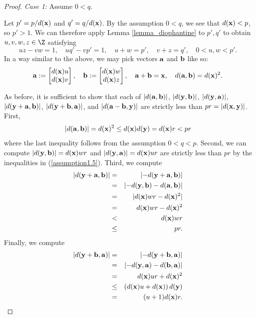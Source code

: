 \begin{proof}
	\noindent \emph{Case 1:} Assume $0 < q$. 
	
	Let $p' = p / d({\mathbf{x}})$ and $q' = q / d({\mathbf{x}})$. By the assumption $0 < q$, we see that $d({\mathbf{x}}) < p$, so $p' > 1$. We can therefore apply Lemma \ref{lemma_diophantine} to $p',q'$ to obtain $u,v,w,z \in \Z$ satisfying 
	\begin{equation}\label{assumption1.5}
	uz - vw = 1,\quad uq' - vp' = 1,\quad u + w = p',\quad v + z = q',\quad 0 < u,w < p'.
	\end{equation}
	In a way similar to the above, we may pick vectors ${\mathbf{a}}$ and ${\mathbf{b}}$ like so: %
	\begin{equation}\label{assumption2}
	\aab := \begin{bmatrix}  d(\xx)u\\ d(\xx)v\end{bmatrix},\quad 
	\bb := \begin{bmatrix} d(\xx)w\\ d(\xx)z\end{bmatrix},
	\quad \aab + \bb = \xx,\quad d(\aab, \bb) = d(\xx)^2. %
	\end{equation}
	
	As before, it is sufficient to show that each of $\lvert d({\mathbf{a}}, {\mathbf{b}}) \rvert$, $\lvert d({\mathbf{y}},{\mathbf{b}}) \rvert$, $\lvert d({\mathbf{y}},{\mathbf{a}}) \rvert$, $\lvert d({\mathbf{y}}+{\mathbf{a}},{\mathbf{b}}) \rvert$, $\lvert d({\mathbf{y}}+{\mathbf{b}},{\mathbf{a}}) \rvert$, and $\lvert d({\mathbf{a}}-{\mathbf{b}},{\mathbf{y}}) \rvert$ are strictly less than $pr  = \lvert d({\mathbf{x}},{\mathbf{y}}) \rvert$. First,
	\[
	\lvert d({\mathbf{a}},{\mathbf{b}}) \rvert = d({\mathbf{x}})^2 \leq d({\mathbf{x}})d({\mathbf{y}}) = d({\mathbf{x}})r < pr
	\]
	where the last inequality follows from the assumption $0 < q < p$. Second, we can compute $\lvert d({\mathbf{y}},{\mathbf{b}}) \rvert = d({\mathbf{x}})w r $ and $ \lvert d({\mathbf{y}},{\mathbf{a}}) \rvert =  d({\mathbf{x}})u r $ are strictly less than $pr$ by the inequalities in (\ref{assumption1.5}). Third, we compute
	\begin{eqnarray*}
		\lvert d(\yy+\aab, \bb) \rvert &=& \lvert -d(\yy+\aab, \bb) \rvert \\
		&=& \lvert -d(\yy,\bb) - d(\aab, \bb) \rvert\\
		&=& \lvert d(\xx)wr - d(\xx)^2 \rvert \\
		&=& d(\xx)wr - d(\xx)^2 \\ %
		&<& d(\xx)wr\\
		&\leq& pr.
	\end{eqnarray*}
	Finally, we compute
	\begin{eqnarray*}
		\lvert d({\mathbf{y}}+{\mathbf{b}}, {\mathbf{a}}) \rvert &=& \lvert -d({\mathbf{y}}+{\mathbf{b}}, {\mathbf{a}}) \rvert \\
		&=& \lvert -d({\mathbf{y}},{\mathbf{a}}) - d({\mathbf{b}}, {\mathbf{a}}) \rvert \\
		&=& d({\mathbf{x}})ur + d({\mathbf{x}})^2 \\
		&\leq& \left(d({\mathbf{x}})u + d({\mathbf{x}})\right)d({\mathbf{y}})\\
		&=& (u+1)d({\mathbf{x}})r.
	\end{eqnarray*}
	

\end{proof}
